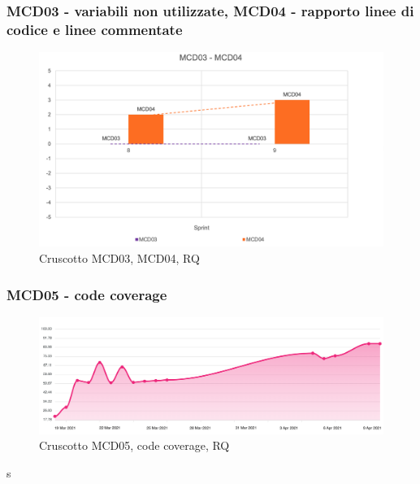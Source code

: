 \subsubsection*{MCD03 - variabili non utilizzate, MCD04 - rapporto linee di codice e linee commentate}
\begin{figure}[H] 
    \centering
    \includegraphics[scale = 0.65]{immagini/MCD03-04.png}
    \caption{Cruscotto MCD03, MCD04, RQ}
\end{figure}

\subsubsection*{MCD05 - code coverage}
\begin{figure}[H] 
    \centering
    \includegraphics[scale = 0.4]{immagini/MCD05.png}
    \caption{Cruscotto MCD05, code coverage, RQ}
\end{figure}

s